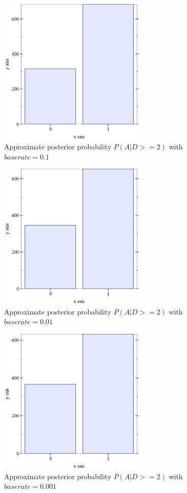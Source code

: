 \begin{figure}[ht!]
  \centering
  \includegraphics[width=7cm]{images/6.1.png}
  \caption{
    Approximate posterior probability $ P(A | D >= 2) $ with $baserate = 0.1 $
  }
  \label{fig:baserate-1}
\end{figure}
\begin{figure}[ht!]
  \centering
  \includegraphics[width=7cm]{images/6.2.png}
  \caption{
    Approximate posterior probability $ P(A | D >= 2) $ with $baserate = 0.01 $
  }
  \label{fig:baserate-01}
\end{figure}
\begin{figure}[ht!]
  \centering
  \includegraphics[width=7cm]{images/6.3.png}
  \caption{
    Approximate posterior probability $ P(A | D >= 2) $ with $baserate = 0.001 $
  }
  \label{fig:baserate-001}
\end{figure}